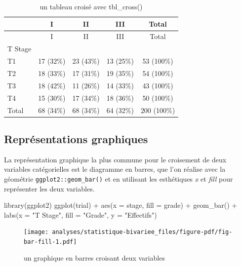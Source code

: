 \documentclass[
  letterpaper,
  DIV=11,
  numbers=noendperiod,
  oneside]{scrreprt}
\newenvironment{Shaded}{\begin{snugshade}}{\end{snugshade}}
\newcommand{\AttributeTok}[1]{\textcolor[rgb]{0.40,0.45,0.13}{#1}}
\newcommand{\FunctionTok}[1]{\textcolor[rgb]{0.28,0.35,0.67}{#1}}
\newcommand{\NormalTok}[1]{\textcolor[rgb]{0.00,0.23,0.31}{#1}}
\newcommand{\SpecialCharTok}[1]{\textcolor[rgb]{0.37,0.37,0.37}{#1}}
\newcommand{\StringTok}[1]{\textcolor[rgb]{0.13,0.47,0.30}{#1}}
\begin{document}
\hypertarget{tbl-cross}{}
\begin{longtable}[]{@{}lcccc@{}}
\caption{\label{tbl-cross}un tableau croisé avec
tbl\_cross()}\tabularnewline
\toprule()
& I & II & III & Total \\
\midrule()
\endfirsthead
\toprule()
& I & II & III & Total \\
\midrule()
\endhead
T Stage & & & & \\
T1 & 17 (32\%) & 23 (43\%) & 13 (25\%) & 53 (100\%) \\
T2 & 18 (33\%) & 17 (31\%) & 19 (35\%) & 54 (100\%) \\
T3 & 18 (42\%) & 11 (26\%) & 14 (33\%) & 43 (100\%) \\
T4 & 15 (30\%) & 17 (34\%) & 18 (36\%) & 50 (100\%) \\
Total & 68 (34\%) & 68 (34\%) & 64 (32\%) & 200 (100\%) \\
\bottomrule()
\end{longtable}

\hypertarget{repruxe9sentations-graphiques}{%
\subsection{Représentations
graphiques}\label{repruxe9sentations-graphiques}}

La représentation graphique la plus commune pour le croisement de deux
variables catégorielles est le diagramme en barres, que l'on réalise
avec la géométrie \texttt{ggplot2::geom\_bar()} et en utilisant les
esthétiques \emph{x} et \emph{fill} pour représenter les deux variables.

\begin{Shaded}
\begin{Highlighting}[]
\FunctionTok{library}\NormalTok{(ggplot2)}
\FunctionTok{ggplot}\NormalTok{(trial) }\SpecialCharTok{+}
  \FunctionTok{aes}\NormalTok{(}\AttributeTok{x =}\NormalTok{ stage, }\AttributeTok{fill =}\NormalTok{ grade) }\SpecialCharTok{+}
  \FunctionTok{geom\_bar}\NormalTok{() }\SpecialCharTok{+}
  \FunctionTok{labs}\NormalTok{(}\AttributeTok{x =} \StringTok{"T Stage"}\NormalTok{, }\AttributeTok{fill =} \StringTok{"Grade"}\NormalTok{, }\AttributeTok{y =} \StringTok{"Effectifs"}\NormalTok{)}
\end{Highlighting}
\end{Shaded}

\begin{figure}[H]

{\centering \texttt{[image: analyses/statistique-bivariee\_files/figure-pdf/fig-bar-fill-1.pdf]}

}

\caption{\label{fig-bar-fill}un graphique en barres croisant deux
variables}

\end{figure}
\end{document}
